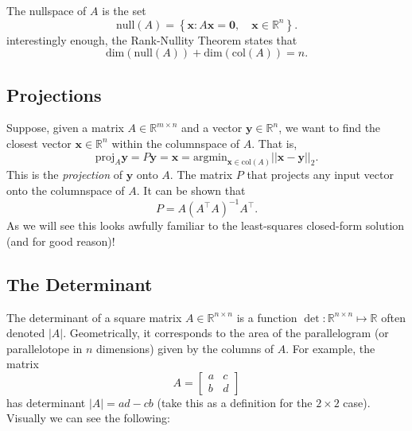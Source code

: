 \documentclass{article}
\newcommand{\1}{\mathbf{1}}
\newcommand{\0}{\mathbf{0}}
\newcommand{\xx}{\mathbf{x}}
\newcommand{\ii}{\mathbf{i}}
\newcommand{\yy}{\mathbf{y}}
\newcommand{\RR}{\mathbb{R}}
\newcommand{\T}{\top}
\newcommand{\argmin}{\mathrm{argmin}}
\newcommand{\m}[1]{\begin{bmatrix} #1 \end{bmatrix}}
\begin{document}
The nullspace of $A$ is the set
\[
    \mathrm{null}(A) = \left\{ \xx : A\xx = \0,\quad \xx\in\RR^n \right\}.
\]
interestingly enough, the Rank-Nullity Theorem states that
\[
    \mathrm{dim}(\mathrm{null}(A)) + \mathrm{dim}(\mathrm{col}(A)) = n.
\]

\subsection{Projections}

Suppose, given a matrix $A\in\RR^{m\times n}$ and a vector $\yy\in\RR^n$,
we want to find the closest vector $\xx\in\RR^n$ within the columnspace
of $A$. That is,
\[
    \mathrm{proj}_A \yy = P\yy = \xx = \argmin_{\xx\in\mathrm{col}(A)} ||\xx-\yy||_2.
\]
This is the \textit{projection} of $\yy$ onto $A$. The matrix $P$ that projects
any input vector onto the columnspace of $A$. It can be shown that
\[
    P = A(A^\T A)^{-1}A^\T.
\]
As we will see this looks awfully familiar to the least-squares closed-form
solution (and for good reason)!

\subsection{The Determinant}

The determinant of a square matrix $A\in\RR^{n\times n}$ is a function
$\det: \RR^{n\times n} \mapsto \RR$ often denoted $|A|$. Geometrically,
it corresponds to the area of the parallelogram (or parallelotope in
$n$ dimensions) given by the columns of $A$. For example, the matrix
\[
    A = \m{a&c\\b&d}
\]
has determinant $|A| = ad-cb$ (take this as a definition for the $2\times2$
case). Visually we can see the following:
\begin{center}
\end{center}
\end{document}

